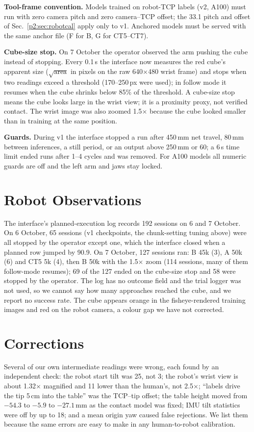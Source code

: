 \documentclass[conference,10pt]{IEEEtran}
\newcommand{\mm}{\,mm\xspace}
\begin{document}
\textbf{Tool-frame convention.} Models trained on robot-TCP labels (v2, A100) must run with zero camera pitch and zero
camera--TCP offset; the 33.1\textdegree{} pitch and offset of Sec.~\ref{p2:sec:robotcal} apply only to v1. Anchored models must be
served with the same anchor file (F for B, G for CT5--CT7).

\textbf{Cube-size stop.} On 7 October the operator observed the arm pushing the cube instead of stopping. Every 0.1\,s the
interface now measures the red cube's apparent size ($\sqrt{\text{area}}$ in pixels on the raw 640$\times$480 wrist frame) and
stops when two readings exceed a threshold (170--250\,px were used); in follow mode it resumes when the cube shrinks below 85\%
of the threshold. A cube-size stop means the cube looks large in the wrist view; it is a proximity proxy, not verified contact.
The wrist image was also zoomed 1.5$\times$ because the cube looked smaller than in training at the same position.

\textbf{Guards.} During v1 the interface stopped a run after 450\mm net travel, 80\mm between inferences, a still period, or
an output above 250\mm or 60\textdegree; a 6\,s time limit ended runs after 1--4 cycles and was removed. For A100 models all
numeric guards are off and the left arm and jaws stay locked.

\section{Robot Observations}\label{p2:sec:robot}
The interface's planned-execution log records 192 sessions on 6 and 7 October. On 6 October, 65 sessions (v1 checkpoints, the
chunk-setting tuning above) were all stopped by the operator except one, which the interface closed when a planned row jumped by
90.9\textdegree. On 7 October, 127 sessions ran: B 45k (3), A 50k (6) and CT5 5k (4), then B 50k with the 1.5$\times$ zoom (114
sessions, many of them follow-mode resumes); 69 of the 127 ended on the cube-size stop and 58 were stopped by the operator.
The log has no outcome field and the trial logger was not used, so we cannot say how many approaches reached the cube, and we
report no success rate. The cube appears orange in the fisheye-rendered training images and red on the robot camera, a colour
gap we have not corrected.

\section{Corrections}\label{p2:sec:corr}
Several of our own intermediate readings were wrong, each found by an independent check: the robot start tilt was 25\textdegree,
not 3\textdegree; the robot's wrist view is about 1.32$\times$ magnified and 11\textdegree{} lower than the human's, not
2.5$\times$; ``labels drive the tip 5\,cm into the table'' was the TCP--tip offset; the table height moved from $-54.3$ to
$-5.9$ to $-27.1$\mm as the contact model was fixed; IMU tilt statistics were off by up to 18\textdegree; and a mean origin yaw
caused false rejections. We list them because the same errors are easy to make in any human-to-robot calibration.
\end{document}
